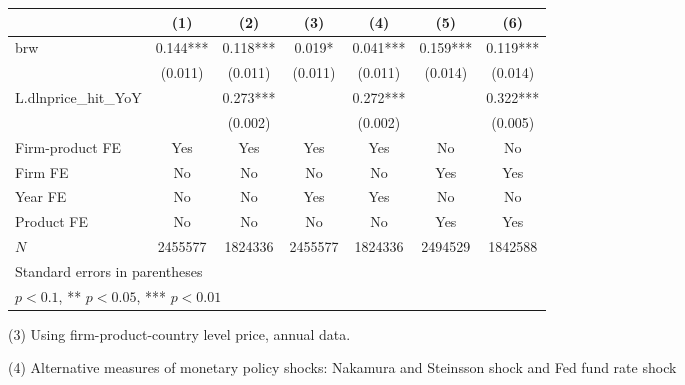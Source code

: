 \documentclass[12pt]{article}
\begin{document}
\begin{tabular}{l*{6}{c}}
\toprule
            &\multicolumn{1}{c}{(1)}   &\multicolumn{1}{c}{(2)}   &\multicolumn{1}{c}{(3)}   &\multicolumn{1}{c}{(4)}   &\multicolumn{1}{c}{(5)}   &\multicolumn{1}{c}{(6)}   \\
\midrule
brw         &       0.144***&       0.118***&       0.019*  &       0.041***&       0.159***&       0.119***\\
            &     (0.011)   &     (0.011)   &     (0.011)   &     (0.011)   &     (0.014)   &     (0.014)   \\
\addlinespace
L.dlnprice\_hit\_YoY&               &       0.273***&               &       0.272***&               &       0.322***\\
            &               &     (0.002)   &               &     (0.002)   &               &     (0.005)   \\
\addlinespace
Firm-product FE&         Yes   &         Yes   &         Yes   &         Yes   &          No   &          No   \\
\addlinespace
Firm FE     &          No   &          No   &          No   &          No   &         Yes   &         Yes   \\
\addlinespace
Year FE     &          No   &          No   &         Yes   &         Yes   &          No   &          No   \\
\addlinespace
Product FE  &          No   &          No   &          No   &          No   &         Yes   &         Yes   \\
\midrule
\(N\)       &     2455577   &     1824336   &     2455577   &     1824336   &     2494529   &     1842588   \\
\bottomrule
\multicolumn{7}{l}{\footnotesize Standard errors in parentheses}\\
\multicolumn{7}{l}{\footnotesize * \(p<0.1\), ** \(p<0.05\), *** \(p<0.01\)}\\
\end{tabular}

(3) Using firm-product-country level price, annual data.

(4) Alternative measures of monetary policy shocks: Nakamura and Steinsson shock and Fed fund rate shock
\end{document}
